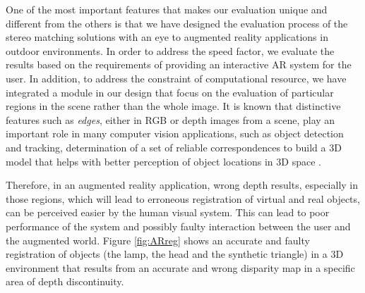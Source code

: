 One of the most important features that makes our evaluation unique and different from the others is that we have 
designed the evaluation process of the stereo matching solutions with an eye to augmented 
reality applications in outdoor environments.
In order to address the speed factor, we evaluate the results based on the requirements of providing an interactive AR system for the user.
In addition, to address the constraint of computational resource, we have integrated a module in our design that 
focus on the evaluation of particular regions in the scene rather than 
the whole image. 
It is known that distinctive features such as {\it edges}, either in RGB or depth images from a scene, 
play an important role in many computer vision applications, such as object detection and 
tracking, determination of a set of reliable correspondences to build a 
3D model that helps with better perception of object locations in 3D space \cite{mart01,sze11}.

Therefore, in an augmented reality application, wrong depth results, especially in those regions, 
which will lead to erroneous registration of virtual and real objects, 
can be perceived easier by the human visual system. This can lead to poor performance of the system and possibly faulty interaction between 
the user and the augmented world.
Figure \ref{fig:ARreg} shows an accurate and faulty registration of objects (the lamp, the head and the synthetic triangle) in a 3D environment that results from an accurate and 
wrong disparity map in a specific area of depth discontinuity.

